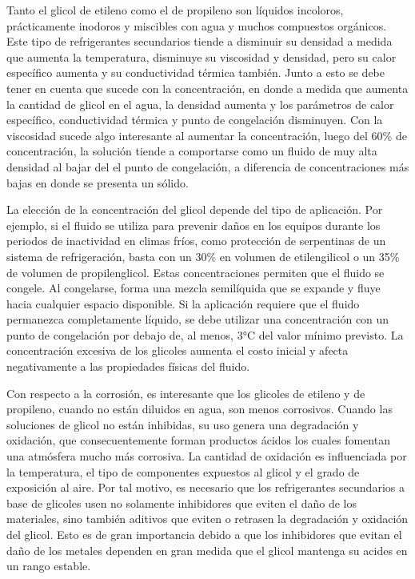 	Tanto el glicol de etileno como el de propileno son líquidos incoloros, prácticamente inodoros y miscibles con agua y muchos compuestos orgánicos. Este tipo de refrigerantes secundarios tiende a disminuir su densidad a medida que aumenta la temperatura, disminuye su viscosidad y densidad, pero su calor específico aumenta y su conductividad térmica también. Junto a esto se debe tener en cuenta que sucede con la concentración, en donde a medida que aumenta la cantidad de glicol en el agua, la densidad aumenta y los parámetros de calor específico, conductividad térmica y punto de congelación disminuyen. Con la viscosidad sucede algo interesante al aumentar la concentración, luego del 60\% de concentración, la solución tiende a comportarse como un fluido de muy alta densidad al bajar del el punto de congelación, a diferencia de concentraciones más bajas en donde se presenta un sólido. 
	
	La elección de la concentración del glicol depende del tipo de aplicación. Por ejemplo, si el fluido se utiliza para prevenir daños en los equipos durante los periodos de inactividad en climas fríos, como protección de serpentinas de un sistema de refrigeración, basta con un 30\% en volumen de etilengilicol o un 35\% de volumen de propilenglicol. Estas concentraciones permiten que el fluido se congele. Al congelarse, forma una mezcla semilíquida que se expande y fluye hacia cualquier espacio disponible. Si la aplicación requiere que el fluido permanezca completamente líquido, se debe utilizar una concentración con un punto de congelación por debajo de, al menos, 3°C del valor mínimo previsto. La concentración excesiva de los glicoles aumenta el costo inicial y afecta negativamente a las propiedades físicas del fluido.
	
	Con respecto a la corrosión, es interesante que los glicoles de etileno y de propileno, cuando no están diluidos en agua, son menos corrosivos. Cuando las soluciones de glicol no están inhibidas, su uso genera una degradación y oxidación, que consecuentemente forman productos ácidos los cuales fomentan una atmósfera mucho más corrosiva. La cantidad de oxidación es influenciada por la temperatura, el tipo de componentes expuestos al glicol y el grado de exposición al aire. Por tal motivo, es necesario que los refrigerantes secundarios a base de glicoles usen no solamente inhibidores que eviten el daño de los materiales, sino también aditivos que eviten o retrasen la degradación y oxidación del glicol. Esto es de gran importancia debido a que los inhibidores que evitan el daño de los metales dependen en gran medida que el glicol mantenga su acides en un rango estable.

